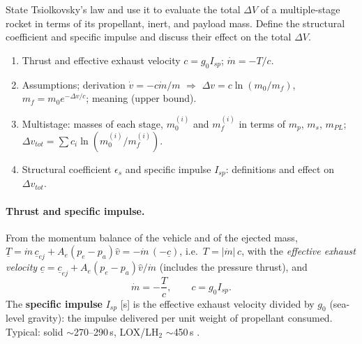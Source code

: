 \begin{qbox}
State Tsiolkovsky's law and use it to evaluate the total $\Delta V$ of a multiple-stage rocket in terms of its propellant, inert,
and payload mass. Define the structural coefficient and specific impulse and discuss their effect on the total $\Delta V$.
\end{qbox}

\begin{outline}
\begin{enumerate}
\item Thrust and effective exhaust velocity $c=g_0I_{sp}$; $\dot m=-T/c$.
\item Assumptions; derivation $\dot v=-c\dot m/m$ $\Rightarrow$ $\Delta v=c\ln(m_0/m_f)$, $m_f=m_0e^{-\Delta v/c}$; meaning (upper bound).
\item Multistage: masses of each stage, $m_0^{(i)}$ and $m_f^{(i)}$ in terms of $m_p$, $m_s$, $m_{PL}$; $\Delta v_{tot}=\sum c_i\ln(m_0^{(i)}/m_f^{(i)})$.
\item Structural coefficient $\epsilon_s$ and specific impulse $I_{sp}$: definitions and effect on $\Delta v_{tot}$.
\end{enumerate}
\end{outline}

\answer
\paragraph{Thrust and specific impulse.} From the momentum balance of the vehicle and of the ejected mass,
$\underline T=\dot m\,\underline c_{ej}+A_e(p_e-p_a)\hat v=-\dot m\,(-\underline c)$, i.e.\ $T=|\dot m|\,c$, with the
\emph{effective exhaust velocity} $\underline c=\underline c_{ej}+A_e(p_e-p_a)\hat v/\dot m$ (includes the pressure thrust), and
\begin{equation}
\dot m=-\frac{T}{c},\qquad c=g_0I_{sp}.
\end{equation}
The \textbf{specific impulse} $I_{sp}$ [s] is the effective exhaust velocity divided by $g_0$ (sea-level gravity): the impulse
delivered per unit weight of propellant consumed. Typical: solid $\sim$270--290\,s, LOX/LH$_2$ $\sim$450\,s \notinnotes.

